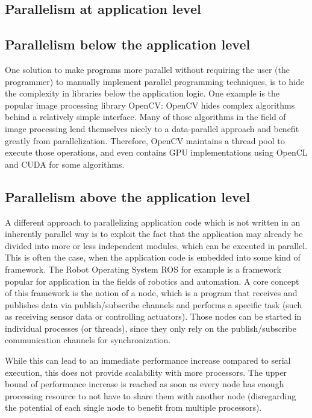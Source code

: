 \documentclass[BCOR20mm,DIV14,10pt,headinclude,footexclude,bibtotoc,liststotoc]{article}
\begin{document}
\subsection{Parallelism at application level}

\subsection{Parallelism below the application level}
One solution to make programs more parallel without requiring the user (the
programmer) to manually implement parallel programming techniques, is to hide
the complexity in libraries below the application logic. One example is the
popular image processing library OpenCV: OpenCV hides complex algorithms behind
a relatively simple interface. Many of those algorithms in the field of image
processing lend themselves nicely to a data-parallel approach and benefit
greatly from parallelization. Therefore, OpenCV maintains a thread pool to
execute those operations, and even contains GPU implementations using OpenCL and
CUDA for some algorithms.

\subsection{Parallelism above the application level}
A different approach to parallelizing application code which is not written in
an inherently parallel way is to exploit the fact that the application may
already be divided into more or less independent modules, which can be executed
in parallel. This is often the case, when the application code is embedded into
some kind of framework. The Robot Operating System ROS for example is a
framework popular for application in the fields of robotics and automation. A
core concept of this framework is the notion of a node, which is a program that
receives and publishes data via publish/subscribe channels and performs a
specific task (such as receiving sensor data or controlling actuators). Those
nodes can be started in individual processes (or threads), since they only rely
on the publish/subscribe communication channels for synchronization.

While this can lead to an immediate performance increase compared to serial
execution, this does not provide scalability with more processors. The upper
bound of performance increase is reached as soon as every node has enough
processing resource to not have to share them with another node (disregarding
the potential of each single node to benefit from multiple processors).
\end{document}
